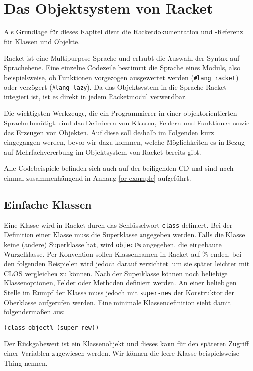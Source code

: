 \section{Das Objektsystem von Racket}
Als Grundlage für dieses Kapitel dient die Racketdokumentation \cite{racketguide-classes} und -Referenz \cite{racketref-classes} für Klassen und Objekte.

Racket ist eine Multipurpose-Sprache und erlaubt die Auswahl der Syntax auf Sprachebene. Eine einzelne Codezeile bestimmt die Sprache eines Moduls, also beispielsweise, ob Funktionen vorgezogen ausgewertet werden (\texttt{\#lang racket}) oder verzögert (\texttt{\#lang lazy}). Da das Objektsystem in die Sprache Racket integiert ist, ist es direkt in jedem Racketmodul verwendbar.

Die wichtigsten Werkzeuge, die ein Programmierer in einer objektorientierten Sprache benötigt, sind das Definieren von Klassen, Feldern und Funktionen sowie das Erzeugen von Objekten. Auf diese soll deshalb im Folgenden kurz eingegangen werden, bevor wir dazu kommen, welche Möglichkeiten es in Bezug auf Mehrfachvererbung im Objektsystem von Racket bereits gibt.

Alle Codebeispiele befinden sich auch auf der beiligenden CD und sind noch einmal zusammenhängend in Anhang \ref{or-example} aufgeführt. 

\subsection{Einfache Klassen}

Eine Klasse wird in Racket durch das Schlüsselwort \texttt{class} definiert. Bei der Definition einer Klasse muss die Superklasse angegeben werden. Falls die Klasse keine (andere) Superklasse hat, wird \texttt{object\%} angegeben, die eingebaute Wurzelklasse. Per Konvention sollen Klassennamen in Racket auf \% enden, bei den folgenden Beispielen wird jedoch darauf verzichtet, um sie später leichter mit CLOS vergleichen zu können. Nach der Superklasse können noch beliebige Klassenoptionen, Felder oder Methoden definiert werden. An einer beliebigen Stelle im Rumpf der Klasse muss jedoch mit \texttt{super-new} der Konstruktor der Oberklasse aufgerufen werden. Eine minimale Klassendefinition sieht damit folgendermaßen aus:

\begin{lstlisting}
(class object% (super-new))
\end{lstlisting}

Der Rückgabewert ist ein Klassenobjekt und dieses kann für den späteren Zugriff einer Variablen zugewiesen werden. Wir können die leere Klasse beispielsweise Thing nennen.

